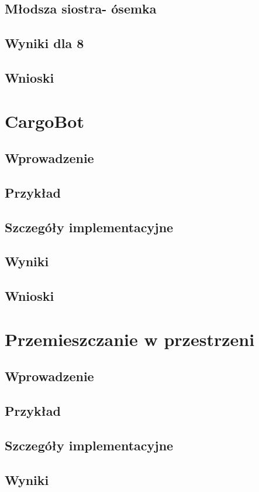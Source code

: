     \subsection{Młodsza siostra- ósemka}

    \subsection{Wyniki dla 8}
    \subsection{Wnioski}
\section{CargoBot}
\label{CargoBotTest}
    \subsection{Wprowadzenie}
        
    \subsection{Przykład}
    \subsection{Szczegóły implementacyjne}
    \subsection{Wyniki}
    \subsection{Wnioski}
\section{Przemieszczanie w przestrzeni}
    \subsection{Wprowadzenie}
    \subsection{Przykład}
    \subsection{Szczegóły implementacyjne}
    \subsection{Wyniki}
